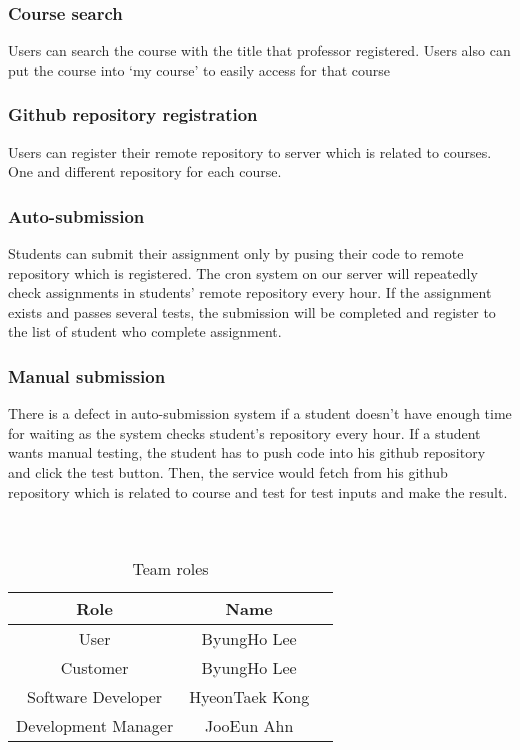 \documentclass[10pt,journal,compsoc]{IEEEtran}
\begin{document}
\subsubsection{Course search}
Users can search the course with the title that professor registered. Users also can put the course into ‘my course’ to easily access for that course

\subsubsection{Github repository registration}
Users can register their remote repository to server which is related to courses. One and different repository for each course.

\subsubsection{Auto-submission}

Students can submit their assignment only by pusing their code to remote repository which is registered. The cron system on our server will repeatedly check assignments in students’ remote repository every hour. If the assignment exists and passes several tests, the submission will be completed and register to the list of student who complete assignment.


\subsubsection{Manual submission}

There is a defect in auto-submission system if a student doesn’t have enough time for waiting as the system checks student’s repository every hour. If a student wants manual testing, the student has to push code into his github repository and click the test button. Then, the service would fetch from his github repository which is related to course and test for test inputs and make the result.\\\\\\


\begin{table}[!t] 
\renewcommand{\arraystretch}{1.3} 
\caption{Team roles} 
\label{Table1} 
\centering 
\begin{tabular}{ccc} 
	\toprule

	Role & Name\\

	\midrule

	User & ByungHo Lee\\

	Customer & ByungHo Lee\\

	Software Developer &	HyeonTaek Kong\\

	Development Manager & JooEun Ahn\\

	\bottomrule

  \end{tabular} 
\end{table} 
\end{document}
